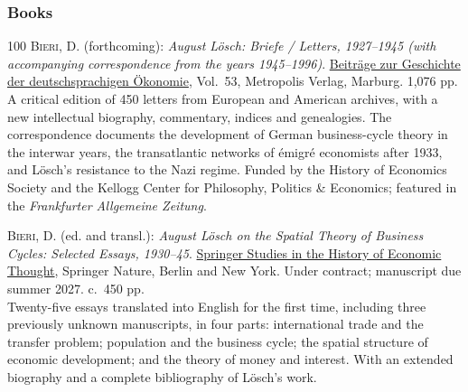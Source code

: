 \documentclass[letter,11pt]{article}
\begin{document}
\subsubsection*{Books}
\begingroup
\renewcommand{\section}[2]{}
\begin{thebibliography}{100}
\textsc{Bieri, D.} (forthcoming): \emph{August L\"{o}sch: Briefe / Letters, 1927--1945 (with accompanying correspondence from the years 1945--1996)}. \href{https://www.metropolis-verlag.de/August-Loesch---Briefe--Letters/1628/book.do}{Beitr\"{a}ge zur Geschichte der deutschsprachigen \"{O}konomie}, Vol.~53, Metropolis Verlag, Marburg. 1,076 pp.\\[2pt]
\noindent A critical edition of 450 letters from European and American archives, with a new intellectual biography, commentary, indices and genealogies. The correspondence documents the development of German business-cycle theory in the interwar years, the transatlantic networks of \'{e}migr\'{e} economists after 1933, and L\"{o}sch's resistance to the Nazi regime. Funded by the History of Economics Society and the Kellogg Center for Philosophy, Politics \& Economics; featured in the \emph{Frankfurter Allgemeine Zeitung}.

\textsc{Bieri, D.} (ed. and transl.): \emph{August L\"{o}sch on the Spatial Theory of Business Cycles: Selected Essays, 1930--45}. \href{https://www.springer.com/series/16457}{Springer Studies in the History of Economic Thought}, Springer Nature, Berlin and New York. Under contract; manuscript due summer 2027. c.~450 pp.\\[2pt]
\noindent Twenty-five essays translated into English for the first time, including three previously unknown manuscripts, in four parts: international trade and the transfer problem; population and the business cycle; the spatial structure of economic development; and the theory of money and interest. With an extended biography and a complete bibliography of L\"{o}sch's work.
\end{thebibliography}
\endgroup
\end{document}
